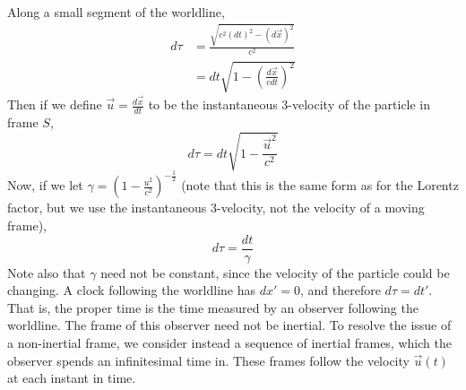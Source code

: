\documentclass[../Main.tex]{subfiles}
\begin{document}
Along a small segment of the worldline,
\begin{align*}
    d\tau &= \frac{\sqrt{c^2 (dt)^2 - (d\vec{x})^2}}{c^2} \\
    &= dt \sqrt{1 - \left(\frac{d\vec{x}}{c dt}\right)^2}
\end{align*}
Then if we define $\vec{u} = \frac{d\vec{x}}{dt}$ to be the instantaneous 3-velocity of the particle in frame $S$,
\begin{equation*}
    d\tau = dt\sqrt{1 - \frac{\vec{u}^2}{c^2}}
\end{equation*}
Now, if we let $\gamma = \left(1-\frac{u^2}{c^2}\right)^{-\frac{1}{2}}$ (note that this is the same form as for the Lorentz factor, but we use the instantaneous 3-velocity, not the velocity of a moving frame),
\begin{equation}
    d\tau = \frac{dt}{\gamma}
    \label{eqnProperTime}
\end{equation}
Note also that $\gamma$ need not be constant, since the velocity of the particle could be changing. A clock following the worldline has $dx' = 0$, and therefore $d\tau = dt'$. That is, the proper time is the time measured by an observer following the worldline. The frame of this observer need not be inertial. To resolve the issue of a non-inertial frame, we consider instead a sequence of inertial frames, which the observer spends an infinitesimal time in. These frames follow the velocity $\vec{u}(t)$ at each instant in time.
\end{document}
